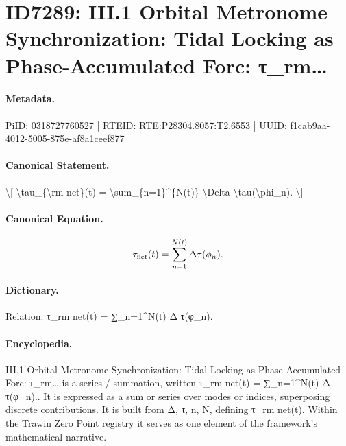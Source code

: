 \section*{ID7289: III.1 Orbital Metronome Synchronization: Tidal Locking as Phase-Accumulated Forc: τ\_rm…}
\paragraph{Metadata.}
PiID: 0318727760527 | RTEID: RTE:P28304.8057:T2.6553 | UUID: f1cab9aa-4012-5005-875e-af8a1ceef877

\paragraph{Canonical Statement.}
\textbackslash{}[ \textbackslash{}tau\_\{\textbackslash{}rm net\}(t) = \textbackslash{}sum\_\{n=1\}\textasciicircum{}\{N(t)\} \textbackslash{}Delta \textbackslash{}tau(\textbackslash{}phi\_n). \textbackslash{}]

\paragraph{Canonical Equation.}
\[
\tau_{\rm net}(t) = \sum_{n=1}^{N(t)} \Delta \tau(\phi_n).
\]

\paragraph{Dictionary.}
Relation: τ\_rm net(t) = ∑\_n=1\textasciicircum{}N(t) Δ τ(φ\_n).

\paragraph{Encyclopedia.}
III.1 Orbital Metronome Synchronization: Tidal Locking as Phase-Accumulated Forc: τ\_rm… is a series / summation, written τ\_rm net(t) = ∑\_n=1\textasciicircum{}N(t) Δ τ(φ\_n).. It is expressed as a sum or series over modes or indices, superposing discrete contributions. It is built from Δ, τ, n, N, defining τ\_rm net(t). Within the Trawin Zero Point registry it serves as one element of the framework's mathematical narrative.
